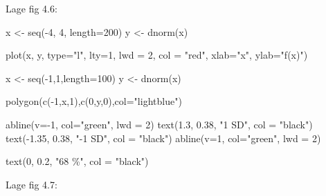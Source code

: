 \documentclass[
]{book}
\newenvironment{Shaded}{\begin{snugshade}}{\end{snugshade}}
\newcommand{\AttributeTok}[1]{\textcolor[rgb]{0.77,0.63,0.00}{#1}}
\newcommand{\DecValTok}[1]{\textcolor[rgb]{0.00,0.00,0.81}{#1}}
\newcommand{\FloatTok}[1]{\textcolor[rgb]{0.00,0.00,0.81}{#1}}
\newcommand{\FunctionTok}[1]{\textcolor[rgb]{0.00,0.00,0.00}{#1}}
\newcommand{\NormalTok}[1]{#1}
\newcommand{\OtherTok}[1]{\textcolor[rgb]{0.56,0.35,0.01}{#1}}
\newcommand{\SpecialCharTok}[1]{\textcolor[rgb]{0.00,0.00,0.00}{#1}}
\newcommand{\StringTok}[1]{\textcolor[rgb]{0.31,0.60,0.02}{#1}}
\begin{document}
Lage fig 4.6:

\begin{Shaded}
\begin{Highlighting}[]
\NormalTok{x }\OtherTok{\textless{}{-}} \FunctionTok{seq}\NormalTok{(}\SpecialCharTok{{-}}\DecValTok{4}\NormalTok{, }\DecValTok{4}\NormalTok{, }\AttributeTok{length=}\DecValTok{200}\NormalTok{)}
\NormalTok{y }\OtherTok{\textless{}{-}} \FunctionTok{dnorm}\NormalTok{(x)}

\FunctionTok{plot}\NormalTok{(x, y, }\AttributeTok{type=}\StringTok{"l"}\NormalTok{, }\AttributeTok{lty=}\DecValTok{1}\NormalTok{, }\AttributeTok{lwd =} \DecValTok{2}\NormalTok{, }\AttributeTok{col =} \StringTok{"red"}\NormalTok{, }\AttributeTok{xlab=}\StringTok{"x"}\NormalTok{,}
  \AttributeTok{ylab=}\StringTok{"f(x)"}\NormalTok{)}

\NormalTok{x }\OtherTok{\textless{}{-}} \FunctionTok{seq}\NormalTok{(}\SpecialCharTok{{-}}\DecValTok{1}\NormalTok{,}\DecValTok{1}\NormalTok{,}\AttributeTok{length=}\DecValTok{100}\NormalTok{)}
\NormalTok{y }\OtherTok{\textless{}{-}} \FunctionTok{dnorm}\NormalTok{(x)}

\FunctionTok{polygon}\NormalTok{(}\FunctionTok{c}\NormalTok{(}\SpecialCharTok{{-}}\DecValTok{1}\NormalTok{,x,}\DecValTok{1}\NormalTok{),}\FunctionTok{c}\NormalTok{(}\DecValTok{0}\NormalTok{,y,}\DecValTok{0}\NormalTok{),}\AttributeTok{col=}\StringTok{"lightblue"}\NormalTok{)}

\FunctionTok{abline}\NormalTok{(}\AttributeTok{v=}\SpecialCharTok{{-}}\DecValTok{1}\NormalTok{, }\AttributeTok{col=}\StringTok{"green"}\NormalTok{, }\AttributeTok{lwd =} \DecValTok{2}\NormalTok{)}
\FunctionTok{text}\NormalTok{(}\FloatTok{1.3}\NormalTok{, }\FloatTok{0.38}\NormalTok{, }\StringTok{"1 SD"}\NormalTok{, }\AttributeTok{col =} \StringTok{"black"}\NormalTok{)}
\FunctionTok{text}\NormalTok{(}\SpecialCharTok{{-}}\FloatTok{1.35}\NormalTok{, }\FloatTok{0.38}\NormalTok{, }\StringTok{"{-}1 SD"}\NormalTok{, }\AttributeTok{col =} \StringTok{"black"}\NormalTok{)}
\FunctionTok{abline}\NormalTok{(}\AttributeTok{v=}\DecValTok{1}\NormalTok{, }\AttributeTok{col=}\StringTok{"green"}\NormalTok{, }\AttributeTok{lwd =} \DecValTok{2}\NormalTok{)}

\FunctionTok{text}\NormalTok{(}\DecValTok{0}\NormalTok{, }\FloatTok{0.2}\NormalTok{, }\StringTok{"68 \%"}\NormalTok{, }\AttributeTok{col =} \StringTok{"black"}\NormalTok{)}
\end{Highlighting}
\end{Shaded}

Lage fig 4.7:
\end{document}
